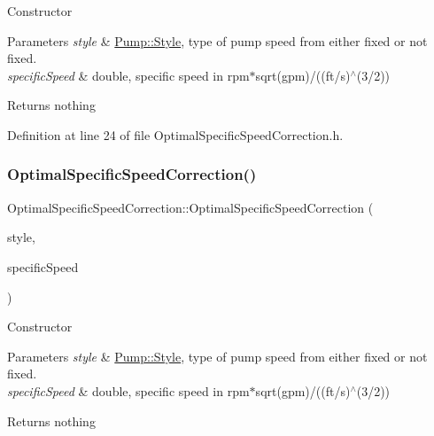 Constructor 
\begin{DoxyParams}{Parameters}
{\em style} & \hyperlink{class_pump_aef354601ce4218258cc898b35a1e90ff}{Pump\+::\+Style}, type of pump speed from either fixed or not fixed. \\
\hline
{\em specific\+Speed} & double, specific speed in rpm$\ast$sqrt(gpm)/((ft/s)$^\wedge$(3/2)) \\
\hline
\end{DoxyParams}
\begin{DoxyReturn}{Returns}
nothing 
\end{DoxyReturn}


Definition at line 24 of file Optimal\+Specific\+Speed\+Correction.\+h.

\mbox{\label{class_optimal_specific_speed_correction_a59cfd32e730fabce525602cbe0b646c4}} 
\subsubsection{\texorpdfstring{Optimal\+Specific\+Speed\+Correction()}{OptimalSpecificSpeedCorrection()}\hspace{0.1cm}{\footnotesize\ttfamily [2/3]}}
{\footnotesize\ttfamily Optimal\+Specific\+Speed\+Correction\+::\+Optimal\+Specific\+Speed\+Correction (\begin{DoxyParamCaption}\item[{\hyperlink{class_pump_aef354601ce4218258cc898b35a1e90ff}{Pump\+::\+Style}}]{style,  }\item[{double}]{specific\+Speed }\end{DoxyParamCaption})\hspace{0.3cm}{\ttfamily [inline]}}

Constructor 
\begin{DoxyParams}{Parameters}
{\em style} & \hyperlink{class_pump_aef354601ce4218258cc898b35a1e90ff}{Pump\+::\+Style}, type of pump speed from either fixed or not fixed. \\
\hline
{\em specific\+Speed} & double, specific speed in rpm$\ast$sqrt(gpm)/((ft/s)$^\wedge$(3/2)) \\
\hline
\end{DoxyParams}
\begin{DoxyReturn}{Returns}
nothing 
\end{DoxyReturn}


